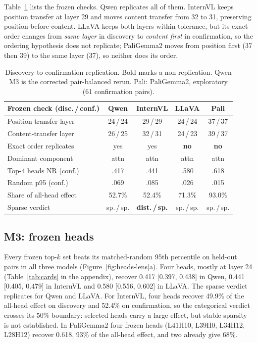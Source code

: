 \documentclass[11pt]{article}
\newcommand{\nr}{\mathrm{NR}}
\begin{document}
Table~\ref{tab:replication} lists the frozen checks. Qwen replicates all of them. InternVL keeps position transfer at layer 29 and moves content transfer from 32 to 31, preserving position-before-content. LLaVA keeps both layers within tolerance, but its exact order changes from \emph{same layer} in discovery to \emph{content first} in confirmation, so the ordering hypothesis does not replicate; PaliGemma2 moves from position first (37 then 39) to the same layer (37), so neither does its order.

\begin{table}[t]
\centering
\footnotesize
\setlength{\tabcolsep}{3pt}
\begin{tabularx}{\columnwidth}{@{}>{\raggedright\arraybackslash}X cccc@{}}
\toprule
Frozen check (disc.\,/\,conf.) & Qwen & InternVL & LLaVA & Pali \\
\midrule
Position-transfer layer & 24\,/\,24 & 29\,/\,29 & 24\,/\,24 & 37\,/\,37 \\
Content-transfer layer & 26\,/\,25 & 32\,/\,31 & 24\,/\,23 & 39\,/\,37 \\
Exact order replicates & yes & yes & \textbf{no} & \textbf{no} \\
Dominant component & attn & attn & attn & attn \\
Top-4 heads $\nr$ (conf.) & .417 & .441 & .580 & .618 \\
Random p95 (conf.) & .069 & .085 & .026 & .015 \\
Share of all-head effect & 52.7\% & 52.4\% & 71.3\% & 93.0\% \\
Sparse verdict & sp.\,/\,sp. & \textbf{dist.\,/\,sp.} & sp.\,/\,sp. & sp.\,/\,sp. \\
\bottomrule
\end{tabularx}
\caption{Discovery-to-confirmation replication. Bold marks a non-replication. Qwen M3 is the corrected pair-balanced rerun. Pali: PaliGemma2, exploratory (61 confirmation pairs).}
\label{tab:replication}
\end{table}

\subsection{M3: frozen heads}

Every frozen top-$k$ set beats its matched-random 95th percentile on held-out pairs in all three models (Figure~\ref{fig:heads-lens}a). Four heads, mostly at layer 24 (Table~\ref{tab:cards} in the appendix), recover 0.417 [0.397, 0.438] in Qwen, 0.441 [0.405, 0.479] in InternVL and 0.580 [0.556, 0.602] in LLaVA. The sparse verdict replicates for Qwen and LLaVA. For InternVL, four heads recover 49.9\% of the all-head effect on discovery and 52.4\% on confirmation, so the categorical verdict crosses its 50\% boundary: selected heads carry a large effect, but stable sparsity is not established. In PaliGemma2 four frozen heads (L41H10, L39H0, L34H12, L28H12) recover 0.618, 93\% of the all-head effect, and two already give 68\%.
\end{document}
